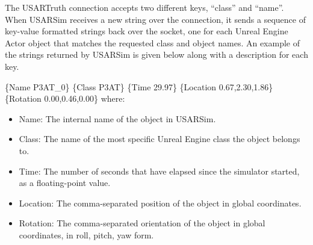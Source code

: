 The USARTruth connection accepts two different keys, ``class'' and ``name''. When USARSim receives a new string over the connection, it sends a sequence of key-value formatted strings back over the socket, one for each Unreal Engine Actor object that matches the requested class and object names. An example of the strings returned by USARSim is given below along with a description for each key.


\{Name P3AT\_0\} \{Class P3AT\} \{Time 29.97\} \{Location 0.67,2.30,1.86\} \\ \{Rotation 0.00,0.46,0.00\} where:

\begin{itemize}
\item Name: The internal name of the object in USARSim.
\item Class: The name of the most specific Unreal Engine class the object belongs to.
\item Time: The number of seconds that have elapsed since the simulator started, as a floating-point value.
\item Location: The comma-separated position of the object in global coordinates.
\item Rotation: The comma-separated orientation of the object in global coordinates, in roll, pitch, yaw form.
\end{itemize}



%

